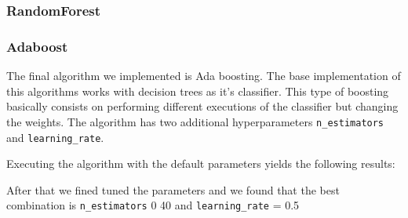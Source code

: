 \begin{verbatim}
\end{verbatim}
 
\pagebreak
\subsubsection{RandomForest}

\subsubsection{Adaboost}

The final algorithm we implemented is Ada boosting. The base implementation of this algorithms works with decision trees as it's classifier. This type of boosting basically consists on performing different executions of the classifier but changing the weights. The algorithm has two additional hyperparameters \texttt{n\_estimators} and \texttt{learning\_rate}.

Executing the algorithm with the default parameters yields the following results:


After that we fined tuned the parameters and we found that the best combination is \texttt{n\_estimators} 0 40 and \texttt{learning\_rate} = 0.5




